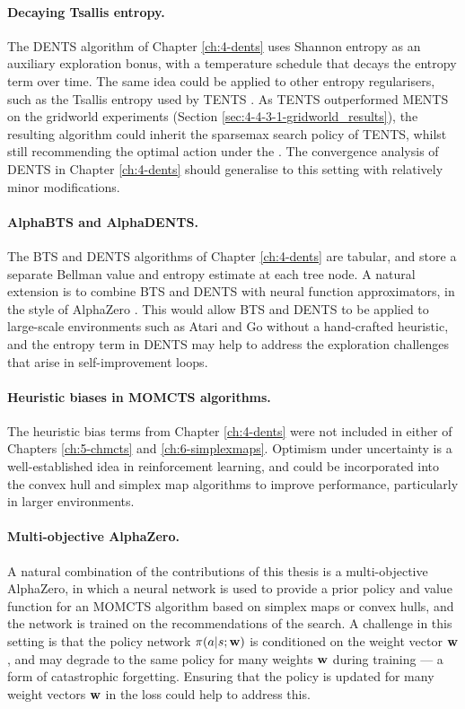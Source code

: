     \paragraph{Decaying Tsallis entropy.}
    The DENTS algorithm of Chapter \ref{ch:4-dents} uses Shannon entropy as an auxiliary exploration bonus, with a temperature schedule that decays the entropy term over time. The same idea could be applied to other entropy regularisers, such as the Tsallis entropy used by TENTS \cite{rentsmytents}. As TENTS outperformed MENTS on the gridworld experiments (Section \ref{sec:4-4-3-1-gridworld_results}), the resulting algorithm could inherit the sparsemax search policy of TENTS, whilst still recommending the optimal action under the . The convergence analysis of DENTS in Chapter \ref{ch:4-dents} should generalise to this setting with relatively minor modifications.

    \paragraph{AlphaBTS and AlphaDENTS.}
    The BTS and DENTS algorithms of Chapter \ref{ch:4-dents} are tabular, and store a separate Bellman value and entropy estimate at each tree node. A natural extension is to combine BTS and DENTS with neural function approximators, in the style of AlphaZero \cite{alpha_zero}. This would allow BTS and DENTS to be applied to large-scale environments such as Atari and Go without a hand-crafted heuristic, and the entropy term in DENTS may help to address the exploration challenges that arise in self-improvement loops.

    \paragraph{Heuristic biases in MOMCTS algorithms.}
    The heuristic bias terms from Chapter \ref{ch:4-dents} were not included in either of Chapters \ref{ch:5-chmcts} and \ref{ch:6-simplexmaps}. Optimism under uncertainty is a well-established idea in reinforcement learning, and could be incorporated into the convex hull and simplex map algorithms to improve performance, particularly in larger environments.

    \paragraph{Multi-objective AlphaZero.}
    A natural combination of the contributions of this thesis is a multi-objective AlphaZero, in which a neural network is used to provide a prior policy and value function for an MOMCTS algorithm based on simplex maps or convex hulls, and the network is trained on the recommendations of the search. A challenge in this setting is that the policy network $\pi(a|s;\mathbf{w})$ is conditioned on the weight vector $\mathbf{w}$, and may degrade to the same policy for many weights $\mathbf{w}$ during training --- a form of catastrophic forgetting. Ensuring that the policy is updated for many weight vectors $\mathbf{w}$ in the loss could help to address this.